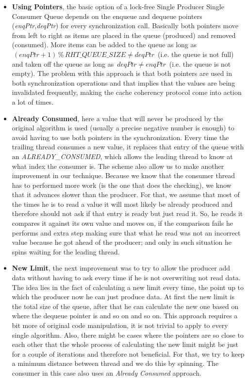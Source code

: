 \begin{itemize}
\item \textbf{Using Pointers}, the basic option of a lock-free Single Producer Single Consumer Queue depends on the enqueue and dequeue pointers (\textit{enqPtr,deqPtr}) for every synchronization call. Basically both pointers move from left to right as items are placed in the queue (produced) and removed (consumed).  More items can be added to the queue as long as $\,(enqPtr+1)\,\%\, RHT\_QUEUE\_SIZE \neq deqPtr\,$ (i.e. the queue is not full) and taken off the queue as long as $\,deqPtr \neq enqPtr\,$ (i.e. the queue is not empty). The problem with this approach is that both pointers are used in both synchronization operations and that implies that the values are being invalidated frequently, making the cache coherency protocol come into action a lot of times.

\item \textbf{Already Consumed}, here a value that will never be produced by the original algorithm is used (usually a precise negative number is enough) to avoid having to use both pointers in the synchronization. Every time the trailing thread consumes a new value, it replaces that entry of the queue with an \textit{ALREADY\_CONSUMED}, which allows the leading thread to know at what index the consumer is. The scheme also allow us to make another improvement in our technique. Because we know that the consumer thread has to performed more work (is the one that does the checking), we know that it advances slower than the producer. For that, we assume that most of the times he is to read a value it will most likely be already produced and therefore should not ask if that entry is ready but just read it. So, he reads it compares it against its own value and moves on, if the comparison fails he performs and extra step making sure that what he read was not an incorrect value because he got ahead of the producer; and only in such situation he spins waiting for the leading thread.

\item \textbf{New Limit}, the next improvement was to try to allow the producer add data without having to ask every time if he is not overwriting not read data. The idea lies in the fact of calculating a new limit every time, the point up to which the producer now he can just produce data. At first the new limit is the total size of the queue, after that he can calculate the new one based on where the dequeue pointer is and so on and so on. This approach requires a bit more of original code manipulation, it is not trivial to apply to every single algorithm. Also, there might be cases where the pointers are so close to each other that the whole process of calculating the new limit might be just for a couple of iterations and therefore not beneficial. For that, we try to keep a minimum distance between thread and we do this by spinning. The consumer in this case also uses an \textit{Already Consumed} approach. 
\end{itemize}

